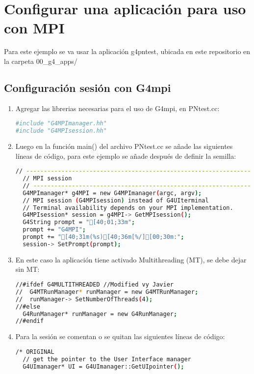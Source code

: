 \section{Configurar una aplicación para uso con MPI}

Para este ejemplo se va usar la aplicación g4pntest, ubicada en este repositorio en la carpeta 00_g4_apps/

\subsection{Configuración sesión con G4mpi}

\begin{enumerate}
    \item Agregar las librerias necesarias para el uso de G4mpi, en PNtest.cc:

\begin{lstlisting}[language=bash,style=mystyle]
#include "G4MPImanager.hh"
#include "G4MPIsession.hh"
\end{lstlisting}
    
    \item Luego en la función main() del archivo PNtest.cc se añade las siguientes líneas de código, para este ejemplo se añade después de definir la semilla:

\begin{lstlisting}[language=bash,style=mystyle]
  // --------------------------------------------------------------------
  // MPI session
  // --------------------------------------------------------------------
  G4MPImanager* g4MPI = new G4MPImanager(argc, argv);
  // MPI session (G4MPIsession) instead of G4UIterminal
  // Terminal availability depends on your MPI implementation.
  G4MPIsession* session = g4MPI-> GetMPIsession();
  G4String prompt = "[40;01;33m";
  prompt += "G4MPI";
  prompt += "[40;31m(%s)[40;36m[%/][00;30m:";
  session-> SetPrompt(prompt);
\end{lstlisting}
    
    \item En este caso la aplicación tiene activado Multithreading (MT), se debe dejar sin MT:
\begin{lstlisting}[language=bash,style=mystyle]
//#ifdef G4MULTITHREADED //Modified vy Javier
//  G4MTRunManager* runManager = new G4MTRunManager;
//  runManager-> SetNumberOfThreads(4);
//#else
  G4RunManager* runManager = new G4RunManager;
//#endif
\end{lstlisting}    
    
    \item Para la sesión se comentan o se quitan las siguientes líneas de código:
\begin{lstlisting}[language=bash,style=mystyle]
/* ORIGINAL
  // get the pointer to the User Interface manager
  G4UImanager* UI = G4UImanager::GetUIpointer();  


\end{lstlisting}
\end{enumerate}
